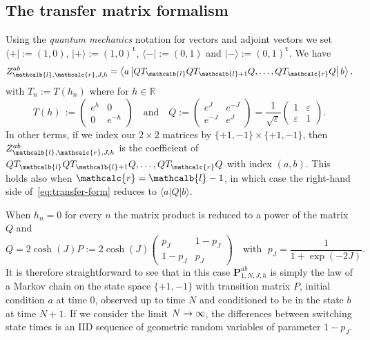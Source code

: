 \documentclass[AHL,Unicode,longabstracts,published]{cedram}
\newcommand{\bP}{\mathbf{P}}
\newcommand{\bbR}{\mathbb{R}}
\newcommand{\gep}{\varepsilon}
\newcommand{\ttt}{\mathtt{t}}
\newcommand{\tsp}{\ttt}
\renewcommand{\ell}{\mathcalb{l}}
\newcommand{\err}{\mathcalc{r}}
\renewcommand*{\to}{\mathchoice{\longrightarrow}{\rightarrow}{\rightarrow}{\rightarrow}}
\begin{document}
\subsection{The transfer matrix formalism}\label{sec:tm}

Using the \emph{quantum mechanics} notation for vectors and adjoint vectors we set $\langle +|:=(1,0)$, $|+ \rangle:=(1,0)^{\tsp}$, $\langle -|:=(0,1)$ and $| - \rangle := (0,1)^{\tsp}$. We have
\begin{equation}\label{eq:transfer-form}
{Z}_{\ell, \err, J, h}^{ab}= \left\langle a \left| Q T_\ell Q T_{\ell+1} Q,\dots, Q T_{\err} Q
\right| b \right\rangle,
\end{equation}
with $T_n:=T(h_n)$ where for $h \in \bbR$
\begin{equation}\label{eq:transmat}
T(h)\, :=
\begin{pmatrix}
e^{h} & 0\\
0 & e^{-h}
\end{pmatrix}
\quad\text{and} \quad Q :=
\begin{pmatrix}
e^{J} & e^{-J} \\
e^{-J} & e^{J}
\end{pmatrix} = \frac 1{\sqrt{\gep}}
\begin{pmatrix}
1 & \gep\\
\gep & 1
\end{pmatrix}
.
\end{equation}
In other terms, if we index our $2 \times 2$ matrices by $\{+1, -1\} \times \{+1, -1\}$, then ${Z}_{\ell, \err, J, h}^{ab}$ is the coefficient of $Q T_\ell Q T_{\ell+1} Q, \dots, Q T_{\err} Q$ with index $(a,b)$. This holds also when $\err=\ell-1$, in which case the right-hand side of~\eqref{eq:transfer-form} reduces to $\langle a | Q | b \rangle$.

\begin{rema}\label{rem:h=0}
When $h_n=0$ for every $n$ the matrix product is reduced to a power of the matrix $Q$ and
\begin{equation}
Q= 2 \cosh(J) P:= 2 \cosh(J)
\begin{pmatrix}
p_J & 1- p_J \\
1- p_J & p_J
\end{pmatrix}
\quad \text{with }\; p_J= \frac 1{ 1+\exp(-2J)}.
\end{equation}
It is therefore straightforward to see that in this case $\bP^{ab}_{1,N, J, h}$ is simply the law of a Markov chain on the state space $\{+1,-1\}$ with transition matrix $P$, initial condition $a$ at time $0$, observed up to time $N$ and conditioned to be in the state $b$ at time $N+1$. If we consider the limit $N\to \infty$, the differences between switching state times is an IID sequence of geometric random variables of parameter $1-p_J$.
\end{rema}
\end{document}
